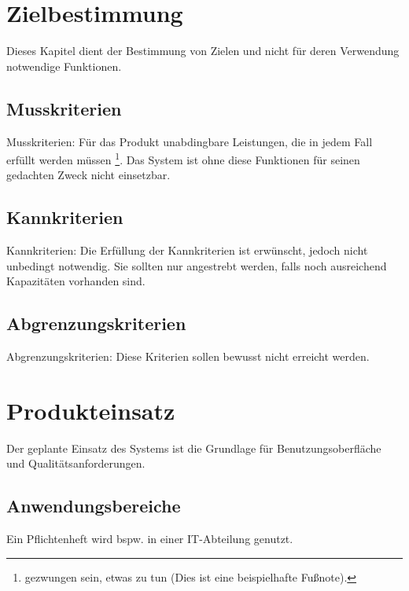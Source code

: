 \documentclass[a4paper]{scrreprt}
\begin{document}
 
 
    \tableofcontents
 
    \chapter{Zielbestimmung}
    Dieses Kapitel dient der Bestimmung von Zielen und nicht für deren Verwendung
    notwendige Funktionen.
 
        \section{Musskriterien}
            Musskriterien: Für das Produkt unabdingbare Leistungen, die in jedem Fall
            erfüllt werden müssen \footnote{gezwungen sein, etwas zu tun (Dies ist eine
            beispielhafte Fußnote).}. Das System ist ohne diese Funktionen für seinen
            gedachten Zweck nicht einsetzbar.
 
        \section{Kannkriterien}
            Kannkriterien: Die Erfüllung der Kannkriterien ist erwünscht, jedoch nicht
            unbedingt notwendig. Sie sollten nur angestrebt werden, falls noch ausreichend
            Kapazitäten vorhanden sind.
 
        \section{Abgrenzungskriterien}
            Abgrenzungskriterien: Diese Kriterien sollen bewusst nicht erreicht werden.
 
    \chapter{Produkteinsatz}
        Der geplante Einsatz des Systems ist die Grundlage für Benutzungsoberfläche und
        Qualitätsanforderungen.
 
        \section{Anwendungsbereiche}
            Ein Pflichtenheft wird bspw. in einer IT-Abteilung genutzt.
 
\end{document}
